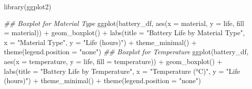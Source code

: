 \documentclass[
  letterpaper,
]{scrbook}
\newenvironment{Shaded}{\begin{snugshade}}{\end{snugshade}}
\newcommand{\AttributeTok}[1]{\textcolor[rgb]{0.40,0.45,0.13}{#1}}
\newcommand{\DocumentationTok}[1]{\textcolor[rgb]{0.37,0.37,0.37}{\textit{#1}}}
\newcommand{\FunctionTok}[1]{\textcolor[rgb]{0.28,0.35,0.67}{#1}}
\newcommand{\NormalTok}[1]{\textcolor[rgb]{0.00,0.23,0.31}{#1}}
\newcommand{\SpecialCharTok}[1]{\textcolor[rgb]{0.37,0.37,0.37}{#1}}
\newcommand{\StringTok}[1]{\textcolor[rgb]{0.13,0.47,0.30}{#1}}
\begin{document}
\begin{Shaded}
\begin{Highlighting}[]
\FunctionTok{library}\NormalTok{(ggplot2)}

\DocumentationTok{\#\# Boxplot for Material Type}
\FunctionTok{ggplot}\NormalTok{(battery\_df, }\FunctionTok{aes}\NormalTok{(}\AttributeTok{x =}\NormalTok{ material, }\AttributeTok{y =}\NormalTok{ life, }\AttributeTok{fill =}\NormalTok{ material)) }\SpecialCharTok{+}
  \FunctionTok{geom\_boxplot}\NormalTok{() }\SpecialCharTok{+}
  \FunctionTok{labs}\NormalTok{(}\AttributeTok{title =} \StringTok{"Battery Life by Material Type"}\NormalTok{, }\AttributeTok{x =} \StringTok{"Material Type"}\NormalTok{, }\AttributeTok{y =} \StringTok{"Life (hours)"}\NormalTok{) }\SpecialCharTok{+}
  \FunctionTok{theme\_minimal}\NormalTok{() }\SpecialCharTok{+}
  \FunctionTok{theme}\NormalTok{(}\AttributeTok{legend.position =} \StringTok{"none"}\NormalTok{)}
\DocumentationTok{\#\# Boxplot for Temperature}
\FunctionTok{ggplot}\NormalTok{(battery\_df, }\FunctionTok{aes}\NormalTok{(}\AttributeTok{x =}\NormalTok{ temperature, }\AttributeTok{y =}\NormalTok{ life, }\AttributeTok{fill =}\NormalTok{ temperature)) }\SpecialCharTok{+}
  \FunctionTok{geom\_boxplot}\NormalTok{() }\SpecialCharTok{+}
  \FunctionTok{labs}\NormalTok{(}\AttributeTok{title =} \StringTok{"Battery Life by Temperature"}\NormalTok{, }\AttributeTok{x =} \StringTok{"Temperature (°C)"}\NormalTok{, }\AttributeTok{y =} \StringTok{"Life (hours)"}\NormalTok{) }\SpecialCharTok{+}
  \FunctionTok{theme\_minimal}\NormalTok{() }\SpecialCharTok{+}
  \FunctionTok{theme}\NormalTok{(}\AttributeTok{legend.position =} \StringTok{"none"}\NormalTok{)}
\end{Highlighting}
\end{Shaded}
\end{document}
